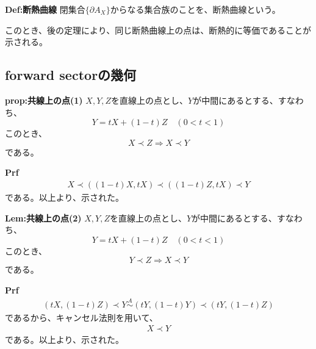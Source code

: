\documentclass[a4paper,11pt]{jsarticle}
\numberwithin{equation}{section}
\begin{document}
\begin{itembox}[l]{\textbf{Def:断熱曲線}}
    閉集合$\{\partial A_X\}$からなる集合族のことを、断熱曲線という。
\end{itembox}
このとき、後の定理により、同じ断熱曲線上の点は、断熱的に等価であることが示される。

\subsection{forward sectorの幾何}
\begin{itembox}[l]{\textbf{prop:共線上の点(1)}}
$X,Y,Z$を直線上の点とし、$Y$が中間にあるとする、すなわち、
\begin{equation}
    Y=tX+(1-t)Z \quad (0<t<1)
\end{equation}
このとき、
\begin{equation}
    X \prec Z \Rightarrow X \prec Y
\end{equation}
である。
\end{itembox}
\textbf{Prf}\\
\begin{align}
    X \prec ((1-t)X,tX) \prec ((1-t)Z,tX) \prec Y
\end{align}
である。以上より、示された。\hfill\qedsymbol\\

\begin{itembox}[l]{\textbf{Lem:共線上の点(2)}}
$X,Y,Z$を直線上の点とし、$Y$が中間にあるとする、すなわち、
\begin{equation}
    Y=tX+(1-t)Z \quad (0<t<1)
\end{equation}
このとき、
\begin{equation}
    Y \prec Z \Rightarrow X \prec Y
\end{equation}
である。
\end{itembox}
\textbf{Prf}\\
\begin{align}
    (tX,(1-t)Z) \prec Y \overset{A}{\sim} (tY,(1-t)Y)\prec (tY,(1-t)Z)
\end{align}
であるから、キャンセル法則を用いて、
\begin{align}
    X \prec Y
\end{align}
である。以上より、示された。\hfill\qedsymbol\\
\end{document}

